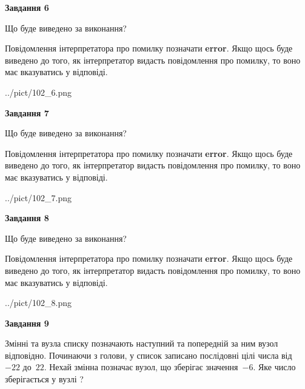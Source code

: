 \documentclass[12pt, ukrainian]{article}
\begin{document}
{\begin {large}
{\begin {center}\textbf{Завдання 6}\end {center}}\par
Що буде виведено за виконання?

Повідомлення інтерпретатора про помилку позначати \textbf{error}.
Якщо щось буде виведено до того, як інтерпретатор видасть повідомлення про помилку, 
то воно має вказуватись у відповіді. \par


\begin{center}
	{../pict/102_6.png}
\end{center}
\newpage

{\begin {center}\textbf{Завдання 7}\end {center}}\par
Що буде виведено за виконання?

Повідомлення інтерпретатора про помилку позначати \textbf{error}.
Якщо щось буде виведено до того, як інтерпретатор видасть повідомлення про помилку, 
то воно має вказуватись у відповіді. \par


\begin{center}
	{../pict/102_7.png}
\end{center}
\newpage

{\begin {center}\textbf{Завдання 8}\end {center}}\par
Що буде виведено за виконання?

Повідомлення інтерпретатора про помилку позначати \textbf{error}.
Якщо щось буде виведено до того, як інтерпретатор видасть повідомлення про помилку, 
то воно має вказуватись у відповіді. \par


\begin{center}
	{../pict/102_8.png}
\end{center}
\newpage

{\begin {center}\textbf{Завдання 9}\end {center}}\par
Змінні  та  вузла списку позначають наступний та попередній за ним вузол відповідно. Починаючи з голови, у список записано послідовні цілі числа від~$-22$ до~$22$. Нехай змінна  позначає вузол, що зберігає значення~$-6$.
Яке число зберігається у вузлі  ?\par
\newpage


\end{large}}
\end{document}
